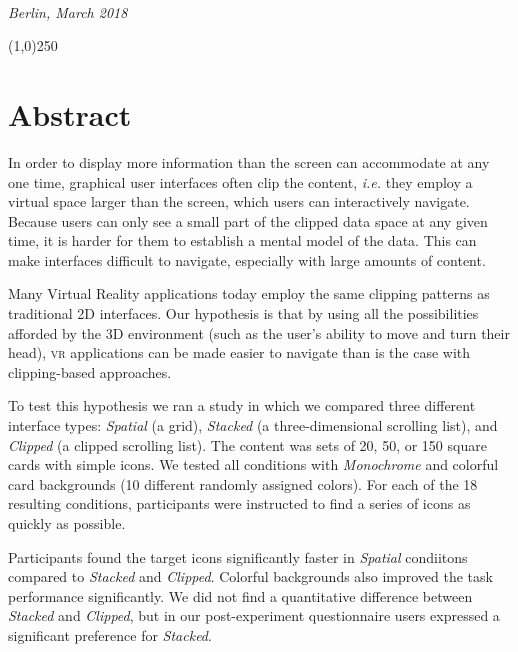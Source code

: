 \documentclass[nobib]{tufte-book} %
\newcommand{\hairsp}{\hspace{1pt}} %
\newcommand{\ie}{\textit{i.\hairsp{}e.}\xspace} %
\begin{document}
~\vspace{3pc}

\emph{Berlin, March 2018}

\line(1,0){250}




\tableofcontents %


\mainmatter


\chapter{Abstract}
In order to display more information than the screen can accommodate at any one time, graphical user interfaces often clip the content, \ie they employ a virtual space larger than the screen, which users can interactively navigate. Because users can only see a small part of the clipped data space at any given time, it is harder for them to establish a mental model of the data. This can make interfaces difficult to navigate, especially with large amounts of content.

Many Virtual Reality applications today employ the same clipping patterns as traditional 2D interfaces. Our hypothesis is that by using all the possibilities afforded by the 3D environment (such as the user's ability to move and turn their head), \textsc{vr} applications can be made easier to navigate than is the case with clipping-based approaches.

To test this hypothesis we ran a study in which we compared three different interface types: \emph{Spatial} (a grid), \emph{Stacked} (a three-dimensional scrolling list), and \emph{Clipped} (a clipped scrolling list). The content was sets of 20, 50, or 150 square cards with simple icons. We tested all conditions with \emph{Monochrome} and colorful card backgrounds (10 different randomly assigned colors). For each of the 18 resulting conditions, participants were instructed to find a series of icons as quickly as possible.

Participants found the target icons significantly faster in \emph{Spatial} condiitons compared to \emph{Stacked} and \emph{Clipped}. Colorful backgrounds also improved the task performance significantly. We did not find a quantitative difference between \emph{Stacked} and \emph{Clipped}, but in our post-experiment questionnaire users expressed a significant preference for \emph{Stacked}.
\end{document}
